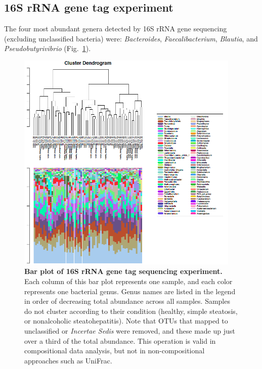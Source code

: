 \subsection{16S rRNA gene tag experiment}

The four most abundant genera detected by 16S rRNA gene sequencing (excluding unclassified bacteria) were: \textit{Bacteroides}, \textit{Faecalibacterium}, \textit{Blautia}, and \textit{Pseudobutyrivibrio} (Fig.~\ref{nafld_16s_barplot}).

\begin{figure}[h]
\begin{center}
\includegraphics[width=0.95\textwidth]{16s_genus_barplot.png}
\caption[Bar plot of 16S rRNA gene tag sequencing experiment.]{\textbf{Bar plot of 16S rRNA gene tag sequencing experiment.} Each column of this bar plot represents one sample, and each color represents one bacterial genus. Genus names are listed in the legend in order of decreasing total abundance across all samples. Samples do not cluster according to their condition (healthy, simple steatosis, or nonalcoholic steatohepatitis). Note that OTUs that mapped to unclassified or \textit{Incertae Sedis} were removed, and these made up just over a third of the total abundance. This operation is valid in compositional data analysis, but not in non-compositional approaches such as UniFrac.}
\label{nafld_16s_barplot}
\end{center}
\end{figure}

